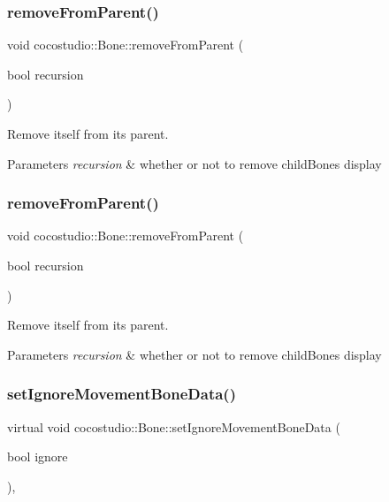 \subsubsection{\texorpdfstring{remove\+From\+Parent()}{removeFromParent()}\hspace{0.1cm}{\footnotesize\ttfamily [1/2]}}
{\footnotesize\ttfamily void cocostudio\+::\+Bone\+::remove\+From\+Parent (\begin{DoxyParamCaption}\item[{bool}]{recursion }\end{DoxyParamCaption})}

Remove itself from its parent. 
\begin{DoxyParams}{Parameters}
{\em recursion} & whether or not to remove child\+Bone\textquotesingle{}s display \\
\hline
\end{DoxyParams}
\mbox{\label{classcocostudio_1_1Bone_a2421050fc95af899b04e69ef7d276404}} 
\subsubsection{\texorpdfstring{remove\+From\+Parent()}{removeFromParent()}\hspace{0.1cm}{\footnotesize\ttfamily [2/2]}}
{\footnotesize\ttfamily void cocostudio\+::\+Bone\+::remove\+From\+Parent (\begin{DoxyParamCaption}\item[{bool}]{recursion }\end{DoxyParamCaption})}

Remove itself from its parent. 
\begin{DoxyParams}{Parameters}
{\em recursion} & whether or not to remove child\+Bone\textquotesingle{}s display \\
\hline
\end{DoxyParams}
\mbox{\label{classcocostudio_1_1Bone_a6c8735332243b0b39df0bc437eb0b733}} 
\subsubsection{\texorpdfstring{set\+Ignore\+Movement\+Bone\+Data()}{setIgnoreMovementBoneData()}\hspace{0.1cm}{\footnotesize\ttfamily [1/2]}}
{\footnotesize\ttfamily virtual void cocostudio\+::\+Bone\+::set\+Ignore\+Movement\+Bone\+Data (\begin{DoxyParamCaption}\item[{bool}]{ignore }\end{DoxyParamCaption})\hspace{0.3cm}{\ttfamily [inline]}, {\ttfamily [virtual]}}


